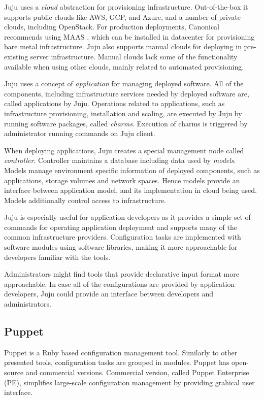\documentclass[officiallayout]{tktla}
\begin{document}
Juju uses a \textit{cloud} abstraction for provisioning infrastructure.
Out-of-the-box it supports public clouds like AWS, GCP, and Azure, and a number
of private clouds, including OpenStack. For production deployments, Canonical
recommends using MAAS \cite{maas}, which can be installed in datacenter for
provisioning bare metal infrastructure. Juju also supports manual clouds for
deploying in pre-existing server infrastructure. Manual clouds lack some of the
functionality available when using other clouds, mainly related to automated
provisioning.

Juju uses a concept of \textit{application} for managing deployed software. All
of the components, including infrastructure services needed by deployed
software are, called applications by Juju. Operations related to applications,
such as infrastructure provisioning, installation and scaling, are executed by
Juju by running software packages, called \textit{charms}. Execution of charms
is triggered by administrator running commands on Juju client.

When deploying applications, Juju creates a special management node called
\textit{controller}. Controller maintains a database including data used by
\textit{models}. Models manage environment specific information of deployed
components, such as applications, storage volumes and network spaces. Hence
models provide an interface between application model, and its implementation
in cloud being used. Models additionally control access to infrastructure.

Juju is especially useful for application developers as it provides a simple
set of commands for operating application deployment and supports many of the
common infrastructure providers. Configuration tasks are implemented with
software modules using software libraries, making it more approachable for
developers familiar with the tools.

Administrators might find tools that provide declarative input format more
approachable. In case all of the configurations are provided by application
developers, Juju could provide an interface between developers and
administrators.

\subsection{Puppet}

Puppet \cite{puppet} is a Ruby based configuration management tool. Similarly
to other presented tools, configuration tasks are grouped in modules. Puppet
has open-source and commercial versions. Commercial version, called Puppet
Enterprise (PE), simplifies large-scale configuration management by providing
grahical user interface.
\end{document}
